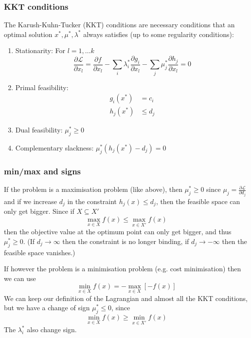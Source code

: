\documentclass[10pt,aspectratio=169,dvipsnames]{beamer}
\def\l{\lambda}
\def\m{\mu}
\def\d{\partial}
\def\cL{\mathcal{L}}
\let\olditem\item
\renewcommand{\item}{%
\olditem\vspace{5pt}}
\begin{document}
\begin{frame}
  \frametitle{KKT conditions}

The \alert{Karush-Kuhn-Tucker (KKT) conditions} are necessary conditions that an optimal solution $x^*,\m^*,\l^*$ always satisfies (up to some regularity conditions):
\begin{enumerate}
\item \alert{Stationarity}: For $l = 1,\dots k$
  \begin{equation*}
  \frac{\d \cL}{\d x_l} =   \frac{\d f}{\d x_l} - \sum_i \l_i^* \frac{\d g_i}{\d x_l}  - \sum_j \m_j^* \frac{\d h_j}{\d x_l} = 0
  \end{equation*}
    \item \alert{Primal feasibility}:
      \begin{align*}
        g_i(x^*) & = c_i \\
        h_j(x^*) &\leq d_j
      \end{align*}
    \item \alert{Dual feasibility}: $\m_j^* \geq 0$
    \item \alert{Complementary slackness}: $\m_j^* (h_j(x^*) - d_j) = 0$
\end{enumerate}

\end{frame}

\begin{frame}
  \frametitle{min/max and signs}

  If the problem is a \alert{maximisation} problem (like above), then
  \alert{$\m_j^* \geq 0$} since $\m_j = \frac{\d \cL}{\d d_j}$ and if we
  increase $d_j$ in the constraint $h_j(x) \leq d_j$, then the
  feasible space can only get bigger. Since if $X \subseteq X'$
  \begin{equation*}
 \max_{x\in X} f(x ) \leq     \max_{x\in X'} f(x)
  \end{equation*}
  then the objective value at the optimum point can only get bigger, and thus $\m_j^* \geq 0$. (If $d_j \to \infty$
  then the constraint is no longer binding, if $d_j \to -\infty$ then
  the feasible space vanishes.)

  If however the problem is a \alert{minimisation} problem (e.g. cost minimisation) then we can use
  \begin{equation*}
      \min_{x\in X} f(x) = - \max_{x\in X} \left[ -f(x)\right]
  \end{equation*}
  We can keep our definition of the Lagrangian and almost all the KKT
  conditions, but we have a change of sign \alert{$\m_j^* \leq 0$}, since
  \begin{equation*}
   \min_{x\in X} f(x ) \geq     \min_{x\in X'} f(x)
  \end{equation*}
  The $\l_i^*$ also change sign.

\end{frame}
\end{document}
